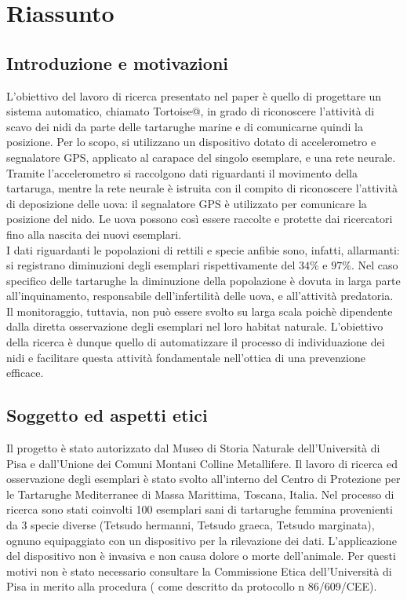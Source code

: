 \documentclass[12pt]{article}
\begin{document}
 	
 	\section{Riassunto}
 		\subsection{Introduzione e motivazioni}
 			L'obiettivo del lavoro di ricerca presentato nel paper è quello di progettare un sistema automatico, chiamato Tortoise@, in grado di riconoscere l'attività di scavo dei nidi da parte delle tartarughe marine e di comunicarne quindi la posizione.
 			Per lo scopo, si utilizzano un dispositivo dotato di accelerometro e segnalatore GPS, applicato al carapace del singolo esemplare, e una rete neurale.
 			Tramite l'accelerometro si raccolgono dati riguardanti il movimento della tartaruga, mentre la rete neurale è istruita con il compito di riconoscere l'attività di deposizione delle uova: il segnalatore GPS è utilizzato per comunicare la posizione del nido. Le uova possono così essere raccolte e protette dai ricercatori fino alla nascita dei nuovi esemplari.\\ 
 			I dati riguardanti le popolazioni di rettili e specie anfibie sono, infatti, allarmanti: si registrano diminuzioni degli esemplari rispettivamente del $34\%$ e $97\%$. Nel caso specifico delle tartarughe la diminuzione della popolazione è dovuta in larga parte all'inquinamento, responsabile dell'infertilità delle uova, e all'attività predatoria.\\  Il monitoraggio, tuttavia, non può essere svolto su larga scala poichè dipendente dalla diretta osservazione degli esemplari nel loro habitat naturale. L'obiettivo della ricerca è dunque quello di automatizzare il processo di individuazione dei nidi e facilitare questa attività fondamentale nell'ottica di una prevenzione efficace.
 		\subsection{Soggetto ed aspetti etici}
 			Il progetto è stato autorizzato dal Museo di Storia Naturale dell'Università di Pisa e dall'Unione dei Comuni Montani Colline Metallifere. Il lavoro di ricerca ed osservazione degli esemplari è stato svolto all'interno del Centro di Protezione per le Tartarughe Mediterranee di Massa Marittima, Toscana, Italia. Nel processo di ricerca sono stati coinvolti 100 esemplari sani di tartarughe femmina provenienti da 3 specie diverse (Tetsudo hermanni, Tetsudo graeca, Tetsudo marginata), ognuno  equipaggiato con un dispositivo per la rilevazione dei dati.  L'applicazione del dispositivo non è invasiva e non causa dolore o morte dell'animale. Per questi motivi non è stato necessario consultare la Commissione Etica dell'Università di Pisa in merito alla procedura ( come descritto da protocollo n 86/609/CEE).
\end{document}
